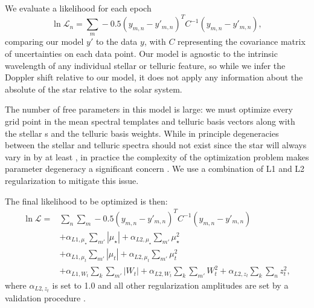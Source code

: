 \documentclass[modern]{aastex62}
\begin{document}
We evaluate a likelihood for each epoch
\begin{equation}
\ln \mathcal{L}_n = \sum_{m} -0.5 (y_{m,n} - y'_{m,n})^T C^{-1} (y_{m,n}-y'_{m,n}),
\end{equation}
comparing our model $y'$ to the data $y$, with $C$ representing the covariance matrix of uncertainties on each data point.
Our model is agnostic to the intrinsic wavelength of any individual stellar or telluric feature, so while we infer the Doppler shift relative to our model, it does not apply any information about the absolute \RV of the star relative to the solar system. 

The number of free parameters in this model is large: we must optimize every grid point in the mean spectral templates and telluric basis vectors along with the stellar \RV s and the telluric basis weights. 
While in principle degeneracies between the stellar and telluric spectra should not exist since the star will always vary in \RV by at least \BERV {}, in practice the complexity of the optimization problem makes parameter degeneracy a significant concern . 
We use a combination of L1 and L2 regularization to mitigate this issue. 

The final likelihood to be optimized is then:
\begin{equation}
\begin{split}
\ln \mathcal{L} = & \sum_{n} \sum_{m} -0.5 (y_{m,n} - y'_{m,n})^T C^{-1} (y_{m,n}-y'_{m,n})  \\
 & + \alpha_{L1, \mu_{\star}}  \sum_{m'} | \mu_{{\star}} | + \alpha_{L2, \mu_{\star}}  \sum_{m'} \mu_{{\star}}^2 \\
 & + \alpha_{L1, \mu_t}  \sum_{m'} | \mu_{t} |  + \alpha_{L2, \mu_t}  \sum_{m'} \mu_{t}^2 \\
 & + \alpha_{L1, W_t}  \sum_{k} \sum_{m'} | W_{t} |  + \alpha_{L2, W_t}  \sum_{k} \sum_{m'} W_{t}^2 + \alpha_{L2, z_t} \sum_{k} \sum_{n} z_{t}^2 ,
\end{split}
\end{equation}
where $\alpha_{L2, z_t}$ is set to 1.0 and all other regularization amplitudes are set by a validation procedure .
\end{document}
